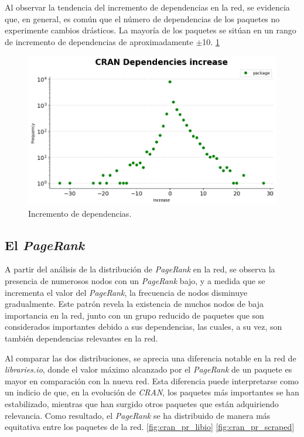 Al observar la tendencia del incremento de dependencias en la red, se evidencia que, en
general, es común que el número de dependencias de los paquetes no experimente cambios
drásticos. La mayoría de los paquetes se sitúan en un rango de incremento de dependencias
de aproximadamente $\pm$10. \ref{fig:cran_dependencies_increase}


\begin{figure}[h!]
    \begin{center}
        \includegraphics[width=1\textwidth]{img/cran/dependencies_increase.png}
        \caption{Incremento de dependencias.}
        \label{fig:cran_dependencies_increase}
    \end{center}
\end{figure}

\subsection{El \textit{PageRank}}

A partir del análisis de la distribución de \textit{PageRank} en la red, se observa la presencia
de numerosos nodos con un \textit{PageRank} bajo, y a medida que se incrementa el valor del
\textit{PageRank}, la frecuencia de nodos disminuye gradualmente. Este patrón revela la
existencia de muchos nodos de baja importancia en la red, junto con un grupo reducido de
paquetes que son considerados importantes debido a sus dependencias, las cuales, a su vez,
son también dependencias relevantes en la red.

Al comparar las dos distribuciones, se aprecia una diferencia notable en la red
de \textit{libraries.io}, donde el valor máximo alcanzado por el \textit{PageRank} de
un paquete es mayor en comparación con la nueva red. Esta diferencia puede interpretarse
como un indicio de que, en la evolución de \textit{CRAN}, los paquetes más importantes
se han estabilizado, mientras que han surgido otros paquetes que están adquiriendo
relevancia. Como resultado, el \textit{PageRank} se ha distribuido de manera más equitativa
entre los paquetes de la red. \ref{fig:cran_pr_libio} \ref{fig:cran_pr_scraped}


